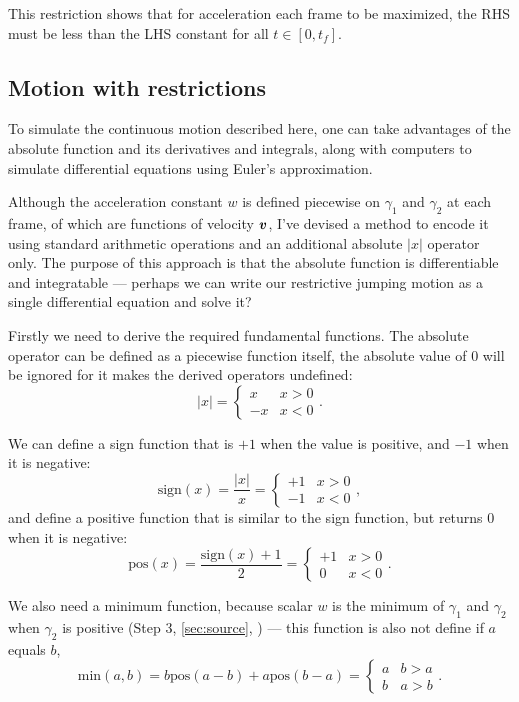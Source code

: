 This restriction shows that for acceleration each frame to be maximized, the RHS must be less than the LHS constant for all $t \in [0, t_f]$.

\subsection{Motion with restrictions}
To simulate the continuous motion described here, one can take advantages of the absolute function and its derivatives and integrals, along with computers to simulate differential equations using Euler's approximation.

Although the acceleration constant $w$ is defined piecewise on $\gamma_1$ and $\gamma_2$ at each frame, of which are functions of velocity $\boldsymbol{v}$, I've devised a method to encode it using standard arithmetic operations and an additional absolute $|x|$ operator only. The purpose of this approach is that the absolute function is differentiable and integratable --- perhaps we can write our restrictive jumping motion as a single differential equation and solve it?

Firstly we need to derive the required fundamental functions. The absolute operator can be defined as a piecewise function itself, the absolute value of $0$ will be ignored for it makes the derived operators undefined:
\[
    |x| = \begin{cases}
        x & x > 0\\
        -x & x < 0
    \end{cases}.
\]

We can define a sign function that is $+1$ when the value is positive, and $-1$ when it is negative:
\[
    \text{sign}(x) = \frac{|x|}{x} = \begin{cases}
        +1 & x > 0\\
        -1 & x < 0
    \end{cases},
\]
and define a positive function that is similar to the sign function, but returns $0$ when it is negative:
\[
    \text{pos}(x) = \frac{\text{sign}(x) + 1}{2} = \begin{cases}
        +1 & x > 0\\
        0 & x < 0
    \end{cases}.
\]

We also need a minimum function, because scalar $w$ is the minimum of $\gamma_1$ and $\gamma_2$ when $\gamma_2$ is positive (Step 3, \autoref{sec:source}, ) --- this function is also not define if $a$ equals $b$,
\[
    \text{min}(a, b) = b \text{pos}(a - b) + a \text{pos}(b - a) = \begin{cases}
        a & b > a\\
        b & a > b
    \end{cases}.
\]

